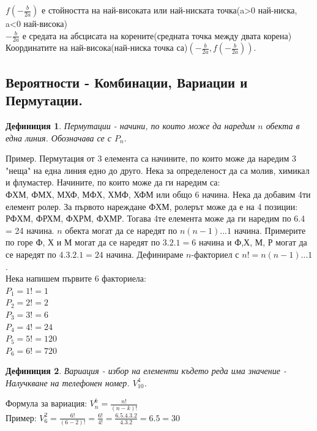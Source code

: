 \documentclass{article}
\newtheorem{definition}{Дефиниция}
\begin{document}
$f(-\frac{b}{2a})  $ е стойността на най-високата или най-ниската точка(a>0 най-ниска, a<0 най-висока) \\
$-\frac{b}{2a} $ е средата на абсцисата на корените(средната точка между двата корена)
Координатите на най-висока(най-ниска точка са)$ (-\frac{b}{2a}, f(-\frac{b}{2a})) $.

\subsection{Вероятности - Комбинации, Вариации и Пермутации.}

\begin{definition}
	Пермутации - начини, по които може да наредим $n$ обекта в една линия. Обозначава се с $P_n$.
\end{definition}
Пример. Пермутация от 3 елемента са начините, по които може да наредим 3 "неща" на една линия едно до друго. Нека за определеност да са молив, химикал и флумастер. Начините, по които може да ги наредим са: \\
ФХМ, ФМХ, МХФ, МФХ, ХМФ, ХФМ или общо 6 начина. Нека да добавим 4ти елемент ролер. За първото нареждане ФХМ, ролерът може да е на 4 позиции:
РФХМ, ФРХМ, ФХРМ, ФХМР. Тогава 4те елемента може да ги наредим по 6.4 = 24 начина. $n$ обекта могат да се наредят по $n(n-1)...1$ начина. 
Примерите по горе Ф, Х и М могат да се наредят по $3.2.1 =6 $ начина и Ф,Х, М, Р могат да се наредят по $4.3.2.1 = 24$ начина. Дефинираме $n$-факториел с $n! = n(n-1)...1$. \\
Нека напишем първите 6 факториела:\\
$P_1 = 1! = 1$ \\
$P_2 = 2! = 2$ \\
$P_3 = 3! = 6$ \\
$P_4 = 4! = 24$ \\
$P_5 = 5! = 120$ \\
$P_6  = 6! = 720$\\


\begin{definition}
Вариация - избор на елементи където реда има значение - Налучкване на телефонен номер. $V_{10}^4$.
\end{definition}
Формула за вариация: 
$V_n^k = \frac{n!}{(n-k)!} $ \\
Пример: $V_6^2 = \frac{6!}{(6-2)!} = \frac{6!}{4!} = \frac{6.5.4.3.2}{4.3.2} = 6.5 = 30$
\end{document}
